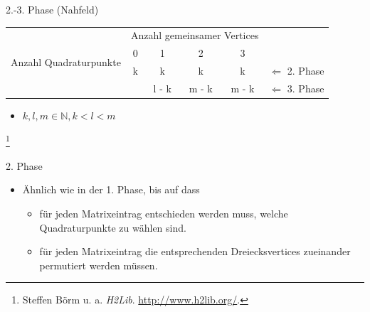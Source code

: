 \documentclass[10pt]{beamer}
\let\svthefootnote\thefootnote
\begin{document}
\begin{frame}{2.-3. Phase (Nahfeld)}
  \begin{tabular}{cccccc} \cmidrule[\heavyrulewidth]{1-5}
     & \multicolumn{4}{c}{Anzahl gemeinsamer Vertices} & \\ \cmidrule{2-5}
    \multirow{2}{*}{Anzahl Quadraturpunkte} & 0 & 1 & 2 & 3 & \\ \cmidrule{2-5}
     & k & k     & k         & k         & \(\Leftarrow\) 2. Phase \\
     &   & l - k & m - k     & m - k     & \(\Leftarrow\) 3. Phase \\
    \cmidrule[\heavyrulewidth]{1-5}
  \end{tabular}
  \begin{itemize}
    \item \(k, l, m \in \mathbb{N}, k < l < m\)
  \end{itemize}

  \footnotesize
  \let\thefootnote\relax\footnote{Steffen Börm u. a. \textit{H2Lib}.
  \url{http://www.h2lib.org/}.}
  \addtocounter{footnote}{-1}\let\thefootnote\svthefootnote\relax
  \normalsize
\end{frame}

\begin{frame}{2. Phase}
  \begin{itemize}
    \item \"Ahnlich wie in der 1. Phase, bis auf dass
    \begin{itemize}
      \item f\"ur jeden Matrixeintrag entschieden werden muss, welche
            Quadraturpunkte zu wählen sind.
      \item f\"ur jeden Matrixeintrag die entsprechenden Dreiecksvertices
            zueinander permutiert werden müssen.
    \end{itemize}
  \end{itemize}
\end{frame}
\end{document}
